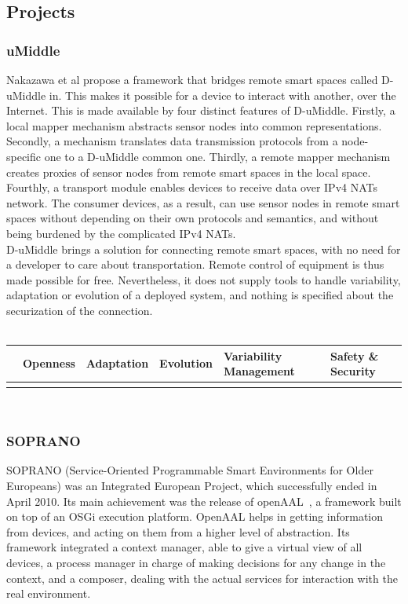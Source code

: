 \subsection{Projects}

\subsubsection{uMiddle}
Nakazawa et al propose a framework that bridges remote smart spaces called D-uMiddle in\cite{Nakazawa:2007}. This makes it possible for a device to interact with another, over the Internet. This is made available by four distinct features of D-uMiddle. Firstly, a local mapper mechanism abstracts sensor nodes into common representations. Secondly, a mechanism translates data transmission protocols from a node-specific one to a D-uMiddle common one. Thirdly, a remote mapper mechanism creates proxies of sensor nodes from remote smart spaces in the local space. Fourthly, a transport module enables devices to receive data over IPv4 NATs network. The consumer devices, as a result, can use sensor nodes in remote smart spaces without depending on their own protocols and semantics, and without being burdened by the complicated IPv4 NATs.\\

D-uMiddle brings a solution for connecting remote smart spaces, with no need for a developer to care about transportation. Remote control of equipment is thus made possible for free. Nevertheless, it does not supply tools to handle variability, adaptation or evolution of a deployed system, and nothing is specified about the securization of the connection.\\
 \\
\begin{tabular}{ >{\centering}m{}| >{\centering}m{} >{\centering}m{}| >{\centering}m{} >{\centering}m{}| >{\centering\arraybackslash}m{}}
{\tiny Interoperability} & {\tiny Openness} & {\tiny Adaptation} & {\tiny Evolution} & {\tiny Variability Management} & {\tiny Safety \& Security}\\
 \hline
  &  &  &  &  & \\ 
  \hline
\end{tabular}\\

\subsubsection{SOPRANO}
SOPRANO (Service-Oriented Programmable Smart Environments for Older Europeans) was an Integrated European Project, which successfully ended in April 2010. Its main achievement was the release of openAAL~\cite{Wolf:2010}, a framework built on top of an OSGi execution platform. OpenAAL helps in getting information from devices, and acting on them from a higher level of abstraction. Its framework integrated a context manager, able to give a virtual view of all devices, a process manager in charge of making decisions for any change in the context, and a composer, dealing with the actual services for interaction with the real environment.\\

